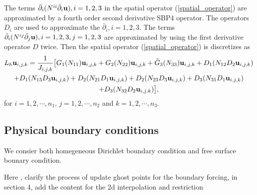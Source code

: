 \documentclass[a4paper]{article}
\begin{document}
The terms $\bar{\partial}_i(N^{ii}\bar{\partial}_i{\bf u}), i = 1,2,3$ in the spatial operator (\ref{spatial_operator}) are approximated by a fourth order second derivative SBP4 operator. The operators $D_i$ are used to approximate the $\bar{\partial}_i, i = 1,2,3$. The terms $\bar{\partial}_i(N^{ij}\bar{\partial}_j{\bf u}), i = 1,2,3, j = 1,2,3$ are approximated by using the first derivative operatoe $D$ twice. Then the spatial operator (\ref{spatial_operator}) is discretizes as
\begin{multline}
L_h{\bf u}_{i,j,k} = \frac{1}{J_{i,j,k}}\big[G_1(N_{11}){\bf u}_{i,j,k}+G_2(N_{22}){\bf u}_{i,j,k}+\tilde{G}_3(N_{33}){\bf u}_{i,j,k}+D_1(N_{12}D_2{\bf u}_{i,j,k})\\
+D_1(N_{13}D_3{\bf u}_{i,j,k})+D_2(N_{21}D_1{\bf u}_{i,j,k})+D_2(N_{23}D_3{\bf u}_{i,j,k})+D_3(N_{31}D_1{\bf u}_{i,j,k})\\
+D_3(N_{32}D_2{\bf u}_{i,j,k})\big],
\end{multline}
for $i = 1,2,\cdots,n_1$, $j = 1,2,\cdots,n_2$ and $k = 1,2,\cdots,n_3$.
 
\subsection{Physical boundary conditions}
We consier both homegeneous Dirichlet boundary condition and free surface bounary condition.

Here , clarify the process of update ghost points for the boundary forcing, in section 4, add the content for the 2d interpolation and restriction
\end{document}

